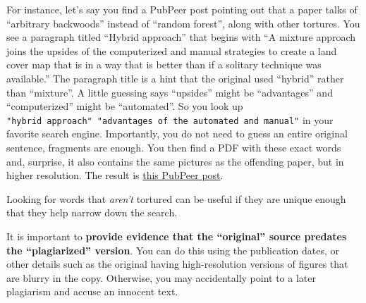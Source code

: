 \documentclass[letterpaper, 12pt]{article}
\begin{document}
For instance, let's say you find a PubPeer post pointing out that a paper talks of ``arbitrary backwoods'' instead of ``random forest'', along with other tortures.
You see a paragraph titled ``Hybrid approach'' that begins with ``A mixture approach joins the upsides of the computerized and manual strategies to create a land cover map that is in a way that is better than if a solitary technique was available.''
The paragraph title is a hint that the original used ``hybrid'' rather than ``mixture''.
A little guessing says ``upsides'' might be ``advantages'' and ``computerized'' might be ``automated''.
So you look up \texttt{"hybrid\ approach"\ "advantages\ of\ the\ automated\ and\ manual"} in your favorite search engine.
Importantly, you do not need to guess an entire original sentence, fragments are enough.
You then find a PDF with these exact words and, surprise, it also contains the same pictures as the offending paper, but in higher resolution.
The result is \href{https://pubpeer.com/publications/AF1D5A725FF3C6C0B3C5030301D6A8\#5}{this PubPeer post}.

Looking for words that \emph{aren't} tortured can be useful if they are unique enough that they help narrow down the search.

It is important to \textbf{provide evidence that the ``original'' source predates the ``plagiarized'' version}.
You can do this using the publication dates, or other details such as the original having high-resolution versions of figures that are blurry in the copy.
Otherwise, you may accidentally point to a later plagiarism and accuse an innocent text.
\end{document}

